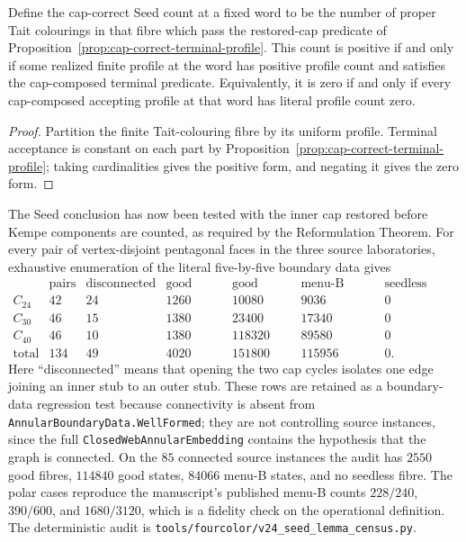 \begin{corollary}
\label{cor:cap-correct-seed-profile-count}
Define the cap-correct Seed count at a fixed word to be the number of proper
Tait colourings in that fibre which pass the restored-cap predicate of
Proposition~\ref{prop:cap-correct-terminal-profile}.  This count is positive
if and only if some realized finite profile at the word has positive profile
count and satisfies the cap-composed terminal predicate.  Equivalently, it is
zero if and only if every cap-composed accepting profile at that word has
literal profile count zero.
\end{corollary}

\begin{proof}
Partition the finite Tait-colouring fibre by its uniform profile.  Terminal
acceptance is constant on each part by
Proposition~\ref{prop:cap-correct-terminal-profile}; taking cardinalities gives
the positive form, and negating it gives the zero form.
\end{proof}

\begin{remark}
\label{rem:seed-census-all-pentagon-pairs}
\Sprose
The Seed conclusion has now been tested with the inner cap restored before
Kempe components are counted, as required by the Reformulation Theorem.
For every pair of vertex-disjoint pentagonal faces in the three source
laboratories, exhaustive enumeration of the literal five-by-five boundary
data gives
\[
\begin{array}{c|r|r|r|r|r|r}
 &\text{pairs}&\text{disconnected}&\text{good fibres}&\text{good states}&
   \text{menu-B states}&\text{seedless fibres}\\ \hline
C_{24}&42&24&1260&10080&9036&0\\
C_{30}&46&15&1380&23400&17340&0\\
C_{40}&46&10&1380&118320&89580&0\\ \hline
\text{total}&134&49&4020&151800&115956&0.
\end{array}
\]
Here ``disconnected'' means that opening the two cap cycles isolates one
edge joining an inner stub to an outer stub.  These rows are retained as a
boundary-data regression test because connectivity is absent from
\texttt{AnnularBoundaryData.WellFormed}; they are not controlling source
instances, since the full \texttt{ClosedWebAnnularEmbedding} contains the
hypothesis that the graph is connected.  On the $85$ connected source
instances the audit has $2550$ good fibres, $114840$ good states, $84066$
menu-B states, and no seedless fibre.
The polar cases reproduce the manuscript's published menu-B counts
\(228/240\), \(390/600\), and \(1680/3120\), which is a fidelity check on
the operational definition.  The deterministic audit is
\texttt{tools/fourcolor/v24\_seed\_lemma\_census.py}.
\end{remark}

